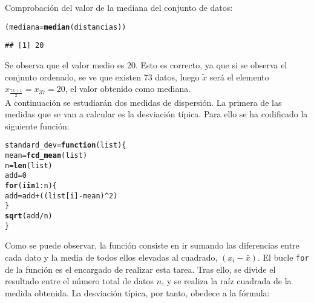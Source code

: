 \documentclass[12pt]{report}\usepackage[]{graphicx}\usepackage[dvipsnames]{xcolor}
\makeatletter
\newcommand{\hlnum}[1]{\textcolor[rgb]{0.686,0.059,0.569}{#1}}%
\newcommand{\hlopt}[1]{\textcolor[rgb]{0,0,0}{#1}}%
\newcommand{\hlstd}[1]{\textcolor[rgb]{0.345,0.345,0.345}{#1}}%
\newcommand{\hlkwa}[1]{\textcolor[rgb]{0.161,0.373,0.58}{\textbf{#1}}}%
\newcommand{\hlkwb}[1]{\textcolor[rgb]{0.69,0.353,0.396}{#1}}%
\newcommand{\hlkwc}[1]{\textcolor[rgb]{0.333,0.667,0.333}{#1}}%
\newcommand{\hlkwd}[1]{\textcolor[rgb]{0.737,0.353,0.396}{\textbf{#1}}}%
\newenvironment{kframe}{%
 \def\at@end@of@kframe{}%
 \ifinner\ifhmode%
  \def\at@end@of@kframe{\end{minipage}}%
  \begin{minipage}{\columnwidth}%
 \fi\fi%
 \def\FrameCommand##1{\hskip\@totalleftmargin \hskip-\fboxsep
 \colorbox{shadecolor}{##1}\hskip-\fboxsep
     \hskip-\linewidth \hskip-\@totalleftmargin \hskip\columnwidth}%
 \MakeFramed {\advance\hsize-\width
   \@totalleftmargin\z@ \linewidth\hsize
   \@setminipage}}%
 {\par\unskip\endMakeFramed%
 \at@end@of@kframe}
\newenvironment{knitrout}{}{} %
\makeatother
\begin{document}
			Comprobación del valor de la mediana del conjunto de datos:
			
\begin{knitrout}
\color{fgcolor}\begin{kframe}
\begin{alltt}
\hlstd{(mediana} \hlkwb{=} \hlkwd{median}\hlstd{(distancias))}
\end{alltt}
\begin{verbatim}
## [1] 20
\end{verbatim}
\end{kframe}
\end{knitrout}
			
			Se observa que el valor medio es 20. Esto es correcto, ya que si se observa el conjunto ordenado, se ve que existen 73 datos, luego $\tilde{x}$ será el elemento $x_{\frac{73+1}{2}} = x_{37} = 20$, el valor obtenido como mediana. \\
			
			A continuación se estudiarán dos medidas de dispersión. La primera de las medidas que se van a calcular es la desviación típica. Para ello se ha codificado la siguiente función:
			
\begin{knitrout}
\color{fgcolor}\begin{kframe}
\begin{alltt}
\hlstd{standard_dev} \hlkwb{=} \hlkwa{function}\hlstd{(}\hlkwc{list}\hlstd{) \{}
        \hlstd{mean} \hlkwb{=} \hlkwd{fcd_mean}\hlstd{(list)}
        \hlstd{n} \hlkwb{=} \hlkwd{len}\hlstd{(list)}
        \hlstd{add} \hlkwb{=} \hlnum{0}
        \hlkwa{for} \hlstd{(i} \hlkwa{in} \hlnum{1}\hlopt{:}\hlstd{n) \{}
                \hlstd{add} \hlkwb{=} \hlstd{add} \hlopt{+} \hlstd{((list[i]} \hlopt{-} \hlstd{mean)}\hlopt{^}\hlnum{2}\hlstd{)}
        \hlstd{\}}
        \hlkwd{sqrt}\hlstd{(add}\hlopt{/}\hlstd{n)}
\hlstd{\}}
\end{alltt}
\end{kframe}
\end{knitrout}
			
			Como se puede observar, la función consiste en ir sumando las diferencias entre cada dato y la media de todos ellos elevadas al cuadrado, $(x_i - \bar{x})$. El bucle \texttt{for} de la función es el encargado de realizar esta tarea. Tras ello, se divide el resultado entre el número total de datos $n$, y se realiza la raíz cuadrada de la medida obtenida. La desviación típica, por tanto, obedece a la fórmula: 
			
\end{document}
